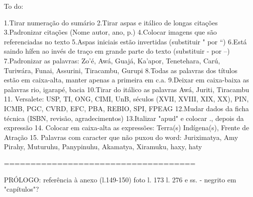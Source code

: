 To do:

1.Tirar numeração do sumário
2.Tirar aspas e itálico de longas citações
3.Padronizar citações (Nome autor, ano, p.)
4.Colocar imagens que são referenciadas no texto
5.Aspas iniciais estão invertidas (substituir " por ``)
6.Está saindo hífen ao invés de traço em grande parte do texto (substituir - por --)
7.Padronizar as palavras: Zo'é, Awá, Guajá, Ka'apor, Tenetehara, Carú, Turiwára, Funai, Assurini, Tiracambu, Gurupi
8.Todas as palavras dos títulos estão em caixa-alta, manter apenas a primeira em c.a.
9.Deixar em caixa-baixa as palavras rio, igarapé, bacia
10.Tirar do itálico as palavras Awá, Juriti, Tiracambu
11. Versalete: USP, TI, ONG, CIMI, UnB, séculos (XVII, XVIII, XIX, XX), PIN, ICMB, PGC, CVRD, EFC, PBA, REBIO, SPI, FPEAG 
12.Mudar dados da ficha técnica (ISBN, revisão, agradecimentos)
13.Italizar "apud" e colocar ., depois da expressão
14. Colocar em caixa-alta as expressões: Terra(s) Indígena(s), Frente de Atração
15. Palavras com caracter que não puxou do word: Juriximatya, Amy Pirahy, Muturuhu, Panypinuhu, Akamatya, Xiramuku, haxy, haty

====================================

PRÓLOGO: referência à anexo (l.149-150)
		 foto l. 173
		 l. 276 e ss. - negrito em "capítulos"?